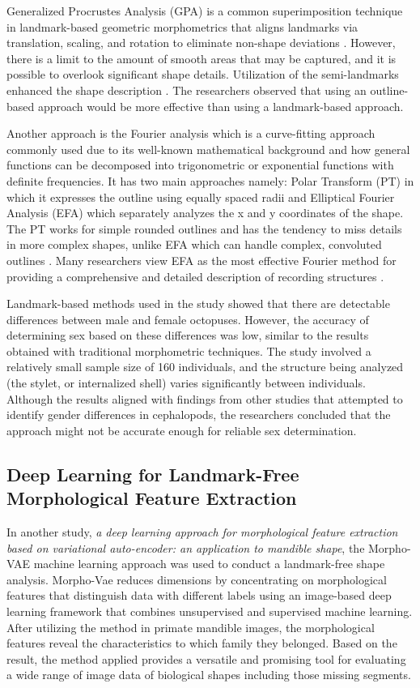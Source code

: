 Generalized Procrustes Analysis (GPA) is a common superimposition technique in landmark-based geometric morphometrics that aligns landmarks via translation, scaling, and rotation to eliminate non-shape deviations \cite{zelditch2004}. However, there is a limit to the amount of smooth areas that may be captured, and it is possible to overlook significant shape details. Utilization of the semi-landmarks enhanced the shape description \cite{adams2004}. The researchers observed that using an outline-based approach would be more effective than using a landmark-based approach.

Another approach is the Fourier analysis which is a curve-fitting approach commonly used due to its well-known mathematical background and how general functions can be decomposed into trigonometric or exponential functions with definite frequencies. It has two main approaches namely: Polar Transform (PT) in which it expresses the outline using equally spaced radii and Elliptical Fourier Analysis (EFA) which separately analyzes the x and y coordinates of the shape. The PT works for simple rounded outlines and has the tendency to miss details in more complex shapes, unlike EFA which can handle complex, convoluted outlines \cite{zahn1972, doering1990, ponton2006}. Many researchers view EFA as the most effective Fourier method for providing a comprehensive and detailed description of recording structures \cite{merigot2007, ferguson2011, legua2013, mahe2016}.

Landmark-based methods used in the study showed that there are detectable differences between male and female octopuses. However, the accuracy of determining sex based on these differences was low, similar to the results obtained with traditional morphometric techniques. The study involved a relatively small sample size of 160 individuals, and the structure being analyzed (the stylet, or internalized shell) varies significantly between individuals. Although the results aligned with findings from other studies that attempted to identify gender differences in cephalopods, the researchers concluded that the approach might not be accurate enough for reliable sex determination.

\subsection{Deep Learning for Landmark-Free Morphological Feature Extraction}
In another study, \textit{a deep learning approach for morphological feature extraction based on variational auto-encoder: an application to mandible shape}, the Morpho-VAE machine learning approach was used to conduct a landmark-free shape analysis. Morpho-Vae reduces dimensions by concentrating on morphological features that distinguish data with different labels using an image-based deep learning framework that combines unsupervised and supervised machine learning. After utilizing the method in primate mandible images, the morphological features reveal the characteristics to which family they belonged. Based on the result, the method applied provides a versatile and promising tool for evaluating a wide range of image data of biological shapes including those missing segments.

